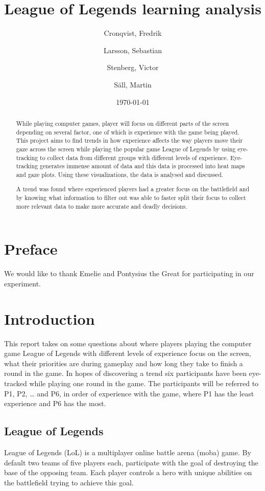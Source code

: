 \documentclass[notitlepage]{report}
\author{Cronqvist, Fredrik \and Larsson, Sebastian \and Stenberg, Victor \and S\"{a}ll, Martin}
\date{\today}
\title{League of Legends learning analysis}
\begin{document}
\maketitle

\begin{abstract}
While playing computer games, player will focus on different parts of the screen depending on several factor, one of which is experience with the game being played. This project aims to find trends in how experience affects the way players move their gaze across the screen while playing the popular game League of Legends by using eye-tracking to collect data from different groups with different levels of experience. Eye-tracking generates immense amount of data and this data is processed into heat maps and gaze plots. Using these visualizations, the data is analysed and discussed.

A trend was found where experienced players had a greater focus on the battlefield and by knowing what information to filter out was able to faster split their focus to collect more relevant data to make more accurate and deadly decisions.
\end{abstract}

\begingroup
\chapter*{Preface}
We would like to thank Emelie and Pontysius the Great for participating in our experiment.

\let\clearpage\relax

\tableofcontents
\endgroup

\chapter{Introduction}
This report takes on some questions about where players playing the computer game League of Legends with different levels of experience focus on the screen, what their priorities are during gameplay and how long they take to finish a round in the game. In hopes of discovering a trend six participants have been eye-tracked while playing one round in the game. The participants will be referred to P1, P2, … and P6, in order of experience with the game, where P1 has the least experience and P6 has the most.

\section{League of Legends}
League of Legends (LoL) is a multiplayer online battle arena (moba) game. By default two teams of five players each, participate with the goal of destroying the base of the opposing team. Each player controls a hero with unique abilities on the battlefield trying to achieve this goal.
\end{document}
